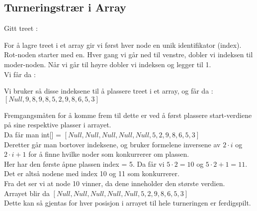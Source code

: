 \documentclass[11pt]{article}
\begin{document}
\subsection{Turneringstrær i Array}
Gitt treet : \\
\begin{center}
\end{center}
For å lagre treet i et array gir vi først hver node en unik identifikator (index). Rot-noden starter med en. Hver gang vi går ned til venstre, dobler vi indeksen til moder-noden.
Når vi går til høyre dobler vi indeksen og legger til 1.\\

\newpage
Vi får da : \\
\begin{center}
\end{center}

Vi bruker så disse indeksene til å plassere treet i et array, og får da :
$[Null, 9, 8, 9, 8, 5, 2, 9, 8, 6, 5, 3]$

Fremgangsmåten for å komme frem til dette er ved å først plassere start-verdiene på sine respektive plasser i arrayet.\\
Da får man int[] = $[Null, Null, Null, Null, Null, 5, 2, 9, 8, 6, 5, 3]$ \\
Deretter går man bortover indeksene, og bruker formelene inversene av  $2\cdot i$ og $2 \cdot i + 1$ for å finne hvilke noder som konkurrerer om plassen.\\
Her har den første åpne plassen index = 5. Da får vi $5 \cdot 2 = 10$ og $5 \cdot 2 + 1 = 11$. \\
Det er altså nodene med index 10 og 11 som konkurrerer. \\
Fra det ser vi at node 10 vinner, da dene inneholder den største verdien. \\
Arrayet blir da $[Null, Null, Null, Null, Null, 5, 2, 9, 8, 6, 5, 3]$ \\
Dette kan så gjentas for hver posisjon i arrayet til hele turneringen er ferdigspilt. \\
\end{document}
